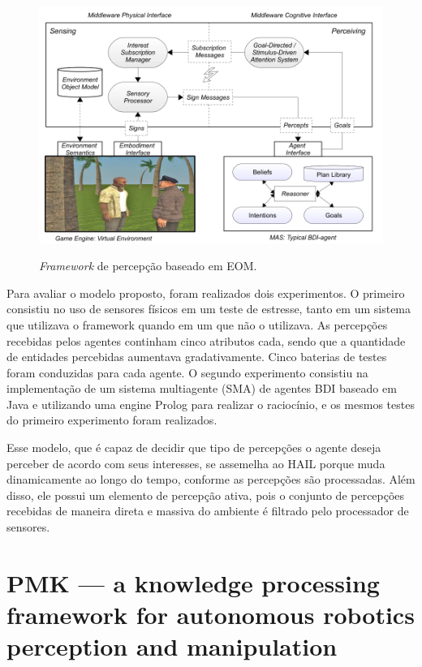 \begin{figure}[h!]
    \centering
    \caption{\textit{Framework} de percepção baseado em EOM.}
    \includegraphics[width=\textwidth]{images/bdiPerceptionModel.png}
    \label{fig:bdiPerceptionModel}
\end{figure}

Para avaliar o modelo proposto, foram realizados dois experimentos. O primeiro consistiu no uso de sensores físicos em um teste de estresse, tanto em um sistema que utilizava o framework quando em um que não o utilizava. As percepções recebidas pelos agentes continham cinco atributos cada, sendo que a quantidade de entidades percebidas aumentava gradativamente. Cinco baterias de testes foram conduzidas para cada agente. O segundo experimento consistiu na implementação de um sistema multiagente (SMA) de agentes BDI baseado em Java e utilizando uma engine Prolog para realizar o raciocínio, e os mesmos testes do primeiro experimento foram realizados.

Esse modelo, que é capaz de decidir que tipo de percepções o agente deseja perceber de acordo com seus interesses, se assemelha ao HAIL porque muda dinamicamente ao longo do tempo, conforme as percepções são processadas. Além disso, ele possui um elemento de percepção ativa, pois o conjunto de percepções recebidas de maneira direta e massiva do ambiente é filtrado pelo processador de sensores.


\section{PMK — a knowledge processing framework for autonomous robotics perception and manipulation \cite{Diab_2019}}

